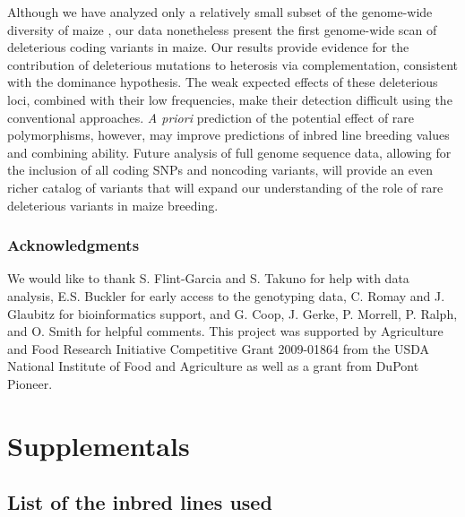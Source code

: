 \documentclass[12pt]{article}
\begin{document}
Although we have analyzed only a relatively small subset of the genome-wide diversity of maize \citep{Chia2012}, our data nonetheless present the first genome-wide scan of deleterious coding variants in maize.  Our results provide evidence for the contribution of deleterious mutations to heterosis via complementation, consistent with the dominance hypothesis. 
The weak expected effects of these deleterious loci, combined with their low frequencies, make their detection difficult using the conventional approaches. \emph{A priori} prediction of the potential effect of rare polymorphisms, however, may improve predictions of inbred line breeding values and combining ability. Future analysis of full genome sequence data, allowing for the inclusion of all coding SNPs and noncoding variants, will provide an even richer catalog of variants that will expand our understanding of the role of rare deleterious variants in maize breeding.

\subsubsection*{Acknowledgments}
We would like to thank S. Flint-Garcia and S. Takuno for help with data analysis, E.S. Buckler for early access to the genotyping data, C. Romay and J. Glaubitz for bioinformatics support, and G. Coop, J. Gerke, P. Morrell, P. Ralph, and O. Smith for helpful comments. 
This project was supported by Agriculture and Food Research Initiative Competitive Grant 2009-01864 from the USDA National Institute of Food and Agriculture as well as a grant from DuPont Pioneer. 

\clearpage


\clearpage
\setcounter{figure}{0}
\setcounter{table}{0}
\renewcommand{\figurename}{Sup. Fig.}
\renewcommand{\tablename}{Sup. Table}


\section*{Supplementals}

\subsection*{List of the inbred lines used } 
\end{document}
